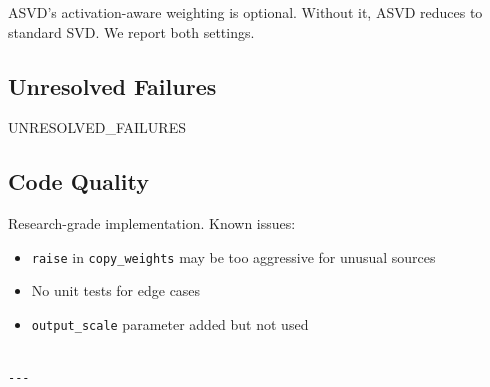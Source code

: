 ASVD's activation-aware weighting is optional. Without it, ASVD reduces 
to standard SVD. We report both settings.

\subsection{Unresolved Failures}

{{UNRESOLVED\_FAILURES}}

\subsection{Code Quality}

Research-grade implementation. Known issues:
\begin{itemize}
\item \texttt{raise} in \texttt{copy\_weights} may be too aggressive for unusual sources
\item No unit tests for edge cases
\item \texttt{output\_scale} parameter added but not used
\end{itemize}
\begin{lstlisting}

---
\end{lstlisting}